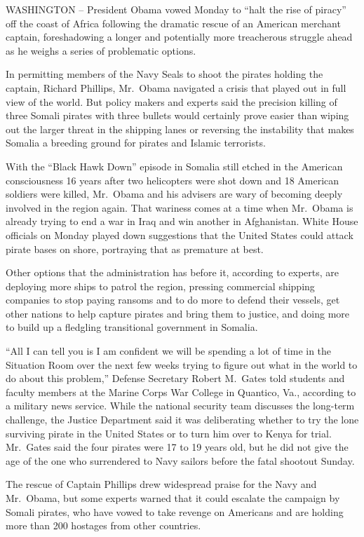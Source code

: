 \documentclass[12pt,a4paper,onecolumn]{article}
\begin{document}
WASHINGTON -- President Obama vowed Monday to ``halt the rise of piracy'' off the coast of Africa
following the dramatic rescue of an American merchant captain, foreshadowing a longer and
potentially more treacherous struggle ahead as he weighs a series of problematic options.

In permitting members of the Navy Seals to shoot the pirates holding the captain, Richard Phillips,
Mr.~Obama navigated a crisis that played out in full view of the world. But policy makers and
experts said the precision killing of three Somali pirates with three bullets would certainly prove
easier than wiping out the larger threat in the shipping lanes or reversing the instability that
makes Somalia a breeding ground for pirates and Islamic terrorists.

With the ``Black Hawk Down'' episode in Somalia still etched in the American consciousness 16 years
after two helicopters were shot down and 18 American soldiers were killed, Mr.~Obama and his
advisers are wary of becoming deeply involved in the region again. That wariness comes at a time
when Mr.~Obama is already trying to end a war in Iraq and win another in Afghanistan. White House
officials on Monday played down suggestions that the United States could attack pirate bases on
shore, portraying that as premature at best.

Other options that the administration has before it, according to experts, are deploying more ships
to patrol the region, pressing commercial shipping companies to stop paying ransoms and to do more
to defend their vessels, get other nations to help capture pirates and bring them to justice, and
doing more to build up a fledgling transitional government in Somalia.

``All I can tell you is I am confident we will be spending a lot of time in the Situation Room over
the next few weeks trying to figure out what in the world to do about this problem,'' Defense
Secretary Robert M.~Gates told students and faculty members at the Marine Corps War College in
Quantico, Va., according to a military news service. While the national security team discusses the
long-term challenge, the Justice Department said it was deliberating whether to try the lone
surviving pirate in the United States or to turn him over to Kenya for trial. Mr.~Gates said the
four pirates were 17 to 19 years old, but he did not give the age of the one who surrendered to Navy
sailors before the fatal shootout Sunday.

The rescue of Captain Phillips drew widespread praise for the Navy and Mr.~Obama, but some experts
warned that it could escalate the campaign by Somali pirates, who have vowed to take revenge on
Americans and are holding more than 200 hostages from other countries.
\end{document}
